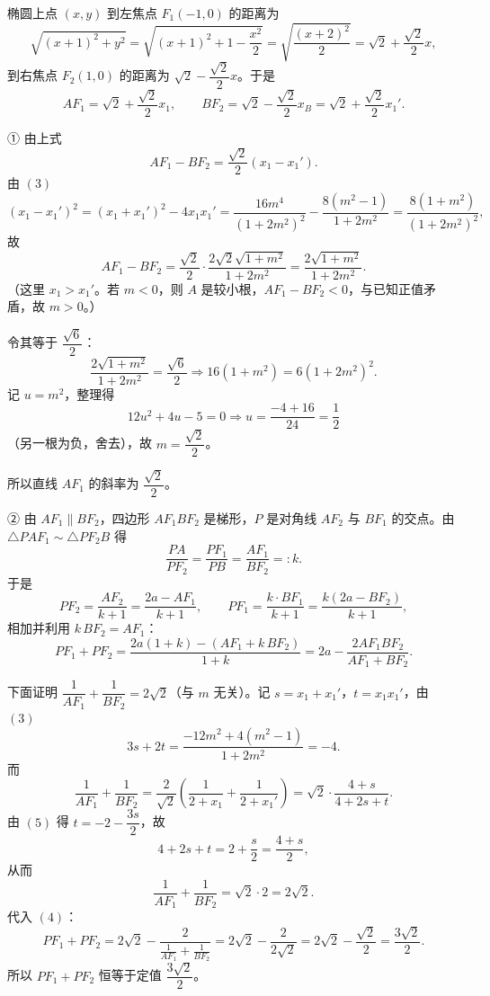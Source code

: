 \begin{answer}
椭圆上点 $(x,y)$ 到左焦点 $F_1(-1,0)$ 的距离为
\nopagebreak[4]
\[\sqrt{(x+1)^2+y^2}=\sqrt{(x+1)^2+1-\frac{x^2}{2}}=\sqrt{\frac{(x+2)^2}{2}}=\sqrt2+\frac{\sqrt2}{2}x,\]
到右焦点 $F_2(1,0)$ 的距离为 $\sqrt2-\dfrac{\sqrt2}{2}x$。于是
\nopagebreak[4]
\[AF_1=\sqrt2+\frac{\sqrt2}{2}x_1,\qquad BF_2=\sqrt2-\frac{\sqrt2}{2}x_B=\sqrt2+\frac{\sqrt2}{2}x_1'.\]

① 由上式
\nopagebreak[4]
\[AF_1-BF_2=\frac{\sqrt2}{2}\left(x_1-x_1'\right).\]
由 $(3)$
\nopagebreak[4]
\[\left(x_1-x_1'\right)^2=\left(x_1+x_1'\right)^2-4x_1x_1'=\frac{16m^4}{\left(1+2m^2\right)^2}-\frac{8(m^2-1)}{1+2m^2}=\frac{8(1+m^2)}{\left(1+2m^2\right)^2},\]
故
\nopagebreak[4]
\[AF_1-BF_2=\frac{\sqrt2}{2}\cdot\frac{2\sqrt2\sqrt{1+m^2}}{1+2m^2}=\frac{2\sqrt{1+m^2}}{1+2m^2}.\]
（这里 $x_1>x_1'$。若 $m<0$，则 $A$ 是较小根，$AF_1-BF_2<0$，与已知正值矛盾，故 $m>0$。）

令其等于 $\dfrac{\sqrt6}{2}$：
\nopagebreak[4]
\[\frac{2\sqrt{1+m^2}}{1+2m^2}=\frac{\sqrt6}{2}\Longrightarrow16\left(1+m^2\right)=6\left(1+2m^2\right)^2.\]
记 $u=m^2$，整理得
\nopagebreak[4]
\[12u^2+4u-5=0\Longrightarrow u=\frac{-4+16}{24}=\frac12\]
（另一根为负，舍去），故 $m=\dfrac{\sqrt2}{2}$。

所以直线 $AF_1$ 的斜率为 $\dfrac{\sqrt2}{2}$。

② 由 $AF_1\parallel BF_2$，四边形 $AF_1BF_2$ 是梯形，$P$ 是对角线 $AF_2$ 与 $BF_1$ 的交点。由 $\triangle PAF_1\sim\triangle PF_2B$ 得
\nopagebreak[4]
\[\frac{PA}{PF_2}=\frac{PF_1}{PB}=\frac{AF_1}{BF_2}=:k.\]
于是
\nopagebreak[4]
\[PF_2=\frac{AF_2}{k+1}=\frac{2a-AF_1}{k+1},\qquad PF_1=\frac{k\cdot BF_1}{k+1}=\frac{k\left(2a-BF_2\right)}{k+1},\]
相加并利用 $k\,BF_2=AF_1$：
\nopagebreak[4]
\[PF_1+PF_2=\frac{2a(1+k)-\left(AF_1+k\,BF_2\right)}{1+k}=2a-\frac{2AF_1BF_2}{AF_1+BF_2}. \tag{4}\]

下面证明 $\dfrac{1}{AF_1}+\dfrac{1}{BF_2}=2\sqrt2$（与 $m$ 无关）。记 $s=x_1+x_1'$，$t=x_1x_1'$，由 $(3)$
\nopagebreak[4]
\[3s+2t=\frac{-12m^2+4\left(m^2-1\right)}{1+2m^2}=-4. \tag{5}\]
而
\nopagebreak[4]
\[\frac{1}{AF_1}+\frac{1}{BF_2}=\frac{2}{\sqrt2}\left(\frac{1}{2+x_1}+\frac{1}{2+x_1'}\right)=\sqrt2\cdot\frac{4+s}{4+2s+t}.\]
由 $(5)$ 得 $t=-2-\dfrac{3s}{2}$，故
\nopagebreak[4]
\[4+2s+t=2+\frac s2=\frac{4+s}{2},\]
从而
\nopagebreak[4]
\[\frac{1}{AF_1}+\frac{1}{BF_2}=\sqrt2\cdot2=2\sqrt2.\]
代入 $(4)$：
\nopagebreak[4]
\[PF_1+PF_2=2\sqrt2-\frac{2}{\frac{1}{AF_1}+\frac{1}{BF_2}}=2\sqrt2-\frac{2}{2\sqrt2}=2\sqrt2-\frac{\sqrt2}{2}=\frac{3\sqrt2}{2}.\]
所以 $PF_1+PF_2$ 恒等于定值 $\dfrac{3\sqrt2}{2}$。


\end{answer}
